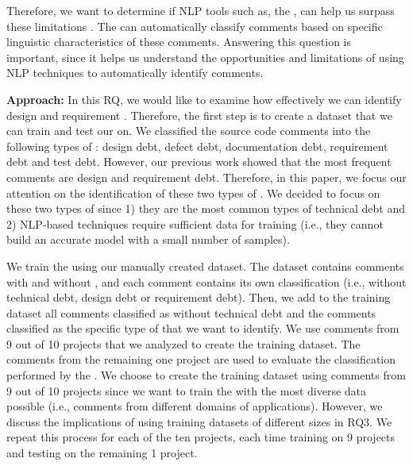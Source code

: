 Therefore, we want to determine if NLP tools such as, the , can help us surpass these limitations . The  can automatically classify comments based on specific linguistic characteristics of these comments. Answering this question is important, since it helps us understand the opportunities and limitations of using NLP techniques to automatically identify \SATD comments. 

\vspace{1mm}
\noindent \textbf{Approach:} In this RQ, we would like to examine how effectively we can identify design and requirement \SATD. Therefore, the first step is to create a dataset that we can train and test our  on. We classified the source code comments into the following types of \SATD: design debt, defect debt, documentation debt, requirement debt and test debt. However, our previous work showed that the most frequent \SATD comments are design and requirement debt. Therefore, in this paper, we focus our attention on the identification of these two types of \SATD. We decided to focus on these two types of \SATD since 1) they are the most common types of technical debt and 2) NLP-based techniques require sufficient data for training (i.e., they cannot build an accurate model with a small number of samples).

We train the  using our manually created dataset. The dataset contains comments with and without \SATD, and each comment contains its own classification (i.e., without technical debt, design debt or requirement debt). Then, we add to the training dataset all comments classified as without technical debt and the comments classified as the specific type of \SATD that we want to identify. We use comments from 9 out of 10 projects that we analyzed to create the training dataset. The comments from the remaining one project are used to evaluate the classification performed by the . We choose to create the training dataset using comments from 9 out of 10 projects since we want to train the  with the most diverse data possible (i.e., comments from different domains of applications). However, we discuss the implications of using training datasets of different sizes in RQ3. We repeat this process for each of the ten projects, each time training on 9 projects and testing on the remaining 1 project.

